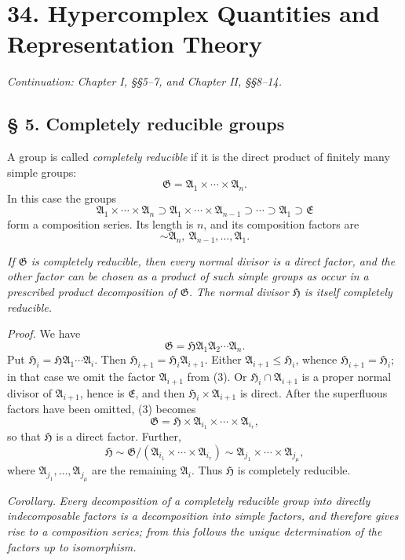 \documentclass[11pt]{article}
\providecommand{\mG}{\mathfrak{G}}
\providecommand{\mA}{\mathfrak{A}}
\providecommand{\mE}{\mathfrak{E}}
\providecommand{\mH}{\mathfrak{H}}
\begin{document}
\setcounter{footnote}{0}
\section*{34. Hypercomplex Quantities and Representation Theory}
\emph{Continuation: Chapter I, §§5--7, and Chapter II, §§8--14.}

\subsection*{§ 5. Completely reducible groups}

A group is called \emph{completely reducible} if it is the direct product of finitely many simple groups:
\[
        \mG=\mA_1\times\cdots\times\mA_n.
\]
In this case the groups
\[
        \mA_1\times\cdots\times\mA_n
        \supset \mA_1\times\cdots\times\mA_{n-1}
        \supset\cdots\supset \mA_1\supset \mE
\]
form a composition series. Its length is $n$, and its composition factors are
\[
        \sim \mA_n,\ \mA_{n-1},\ldots,\mA_1.
\]

\emph{If $\mG$ is completely reducible, then every normal divisor is a direct factor, and the other factor can be chosen as a product of such simple groups as occur in a prescribed product decomposition of $\mG$. The normal divisor $\mH$ is itself completely reducible.}

\emph{Proof.} We have
\begin{equation}
        \mG=\mH\mA_1\mA_2\cdots\mA_n.             \tag{3}
\end{equation}
Put $\mH_i=\mH\mA_1\cdots\mA_i$. Then $\mH_{i+1}=\mH_i\mA_{i+1}$. Either $\mA_{i+1}\leq \mH_i$, whence $\mH_{i+1}=\mH_i$; in that case we omit the factor $\mA_{i+1}$ from (3). Or $\mH_i\cap\mA_{i+1}$ is a proper normal divisor of $\mA_{i+1}$, hence is $\mE$, and then $\mH_i\times\mA_{i+1}$ is direct. After the superfluous factors have been omitted, (3) becomes
\[
        \mG=\mH\times\mA_{i_1}\times\cdots\times\mA_{i_r},
\]
so that $\mH$ is a direct factor. Further,
\[
        \mH\sim \mG/(\mA_{i_1}\times\cdots\times\mA_{i_r})
        \sim \mA_{j_1}\times\cdots\times\mA_{j_\mu},
\]
where $\mA_{j_1},\ldots,\mA_{j_\mu}$ are the remaining $\mA_i$. Thus $\mH$ is completely reducible.

\emph{Corollary.} \emph{Every decomposition of a completely reducible group into directly indecomposable factors is a decomposition into simple factors, and therefore gives rise to a composition series; from this follows the unique determination of the factors up to isomorphism.}
\end{document}
